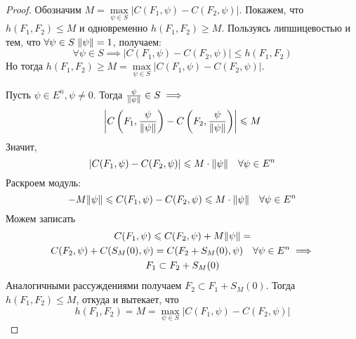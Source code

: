 \begin{proof}
    Обозначим $M = \max\limits_{\psi \in S} |C(F_1, \psi) - C(F_2, \psi)|$.
    Покажем, что $h(F_1, F_2) \leqslant M$  и одновременно $h(F_1, F_2) \geqslant M$.
    Пользуясь липшицевостью и тем, что $\forall \psi \in S \; \lVert \psi \rVert = 1$, получаем:
    \begin{equation*}
        \forall \psi \in S \implies |C(F_1, \psi) - C(F_2, \psi)| \leqslant h(F_1, F_2)
    \end{equation*}
    Но тогда $h(F_1, F_2) \geqslant M = \max\limits_{\psi \in S} |C(F_1, \psi) - C(F_2, \psi)|$.

    Пусть $\psi \in E^n, \psi \neq 0$.
    Тогда $\frac{\psi}{\lVert \psi \rVert} \in S \implies$
    \begin{equation*}
        \left| C \left( F_1, \frac{\psi}{\lVert \psi \rVert} \right)  - C \left( F_2, \frac{\psi}{\lVert \psi \rVert} \right) \right| \leqslant M
    \end{equation*}
    Значит, 
    \begin{equation*}
        |C(F_1, \psi) - C(F_2, \psi)| \leqslant M \cdot \lVert \psi \rVert \quad \forall \psi \in E^n
    \end{equation*}
    Раскроем модуль:
    \begin{equation*}
        -M \lVert \psi \rVert \leqslant C(F_1, \psi) - C(F_2, \psi) \leqslant M \cdot \lVert \psi \rVert \quad \forall \psi \in E^n
    \end{equation*}
    Можем записать 
    \begin{multline*}
        C(F_1, \psi) \leqslant C(F_2, \psi) + M \lVert \psi \rVert =\\
        C(F_2, \psi) + C(S_M(0), \psi) = C(F_2 + S_M(0), \psi) \quad \forall \psi \in E^n \implies \\
        F_1 \subset F_2 + S_M(0)
    \end{multline*}
    Аналогичными рассуждениями получаем $F_2 \subset F_1 + S_M(0)$.
    Тогда $h(F_1, F_2) \leqslant M$, откуда и вытекает, что
    \begin{equation*}
        h(F_1, F_2) = M = \max\limits_{\psi \in S} \left|C(F_1, \psi) - C(F_2, \psi)\right|
    \end{equation*}
\end{proof}

